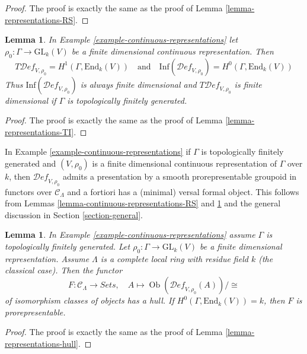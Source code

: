 \documentclass{stacks-project}
\theoremstyle{plain}
\newtheorem{lemma}[subsection]{Lemma}
\theoremstyle{definition}
\theoremstyle{remark}
\numberwithin{equation}{subsection}
\def\Ob{\mathop{\mathrm{Ob}}\nolimits}
\def\Deformationcategory{\mathcal{D}\!\mathit{ef}}
\begin{document}
\begin{proof}
The proof is exactly the same as the proof of
Lemma \ref{lemma-representations-RS}.
\end{proof}

\begin{lemma}
\label{lemma-continuous-representations-TI}
In Example \ref{example-continuous-representations} let
$\rho_0 : \Gamma \to \text{GL}_k(V)$ be a finite dimensional
continuous representation. Then
$$
T\Deformationcategory_{V, \rho_0} = H^1(\Gamma, \text{End}_k(V))
\quad\text{and}\quad
\text{Inf}(\Deformationcategory_{V, \rho_0}) = H^0(\Gamma, \text{End}_k(V))
$$
Thus $\text{Inf}(\Deformationcategory_{V, \rho_0})$
is always finite dimensional
and $T\Deformationcategory_{V, \rho_0}$ is finite dimensional
if $\Gamma$ is topologically finitely generated.
\end{lemma}

\begin{proof}
The proof is exactly the same as the proof of
Lemma \ref{lemma-representations-TI}.
\end{proof}

\noindent
In Example \ref{example-continuous-representations} if $\Gamma$
is topologically finitely generated
and $(V, \rho_0)$ is a finite dimensional continuous representation of $\Gamma$
over $k$, then $\Deformationcategory_{V, \rho_0}$
admits a presentation by a smooth prorepresentable groupoid in functors
over $\mathcal{C}_\Lambda$
and a fortiori has a (minimal) versal formal object. This follows
from Lemmas \ref{lemma-continuous-representations-RS} and
\ref{lemma-continuous-representations-TI}
and the general discussion in Section \ref{section-general}.

\begin{lemma}
\label{lemma-continuous-representations-hull}
In Example \ref{example-continuous-representations} assume $\Gamma$
is topologically finitely generated.
Let $\rho_0 : \Gamma \to \text{GL}_k(V)$ be a finite dimensional representation.
Assume $\Lambda$ is a complete local ring with residue field $k$
(the classical case). Then the functor
$$
F : \mathcal{C}_\Lambda \longrightarrow \textit{Sets},\quad
A \longmapsto \Ob(\Deformationcategory_{V, \rho_0}(A))/\cong
$$
of isomorphism classes of objects has a hull. If
$H^0(\Gamma, \text{End}_k(V)) = k$, then $F$ is
prorepresentable.
\end{lemma}

\begin{proof}
The proof is exactly the same as the proof of
Lemma \ref{lemma-representations-hull}.
\end{proof}
\end{document}
